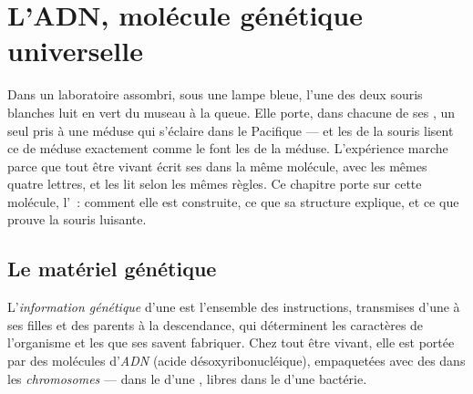\chapter{L'ADN, molécule génétique universelle}\label{ch:g10:universal-dna}

Dans un laboratoire assombri, sous une lampe bleue, l'une des deux
souris blanches luit en vert du museau à la queue. Elle porte, dans
chacune de ses , un seul  pris à une méduse qui s'éclaire
dans le Pacifique --- et les  de la souris lisent ce  de
méduse exactement comme le font les  de la méduse.
L'expérience marche parce que tout être vivant écrit ses  dans la
même molécule, avec les mêmes quatre lettres, et les lit selon les
mêmes règles. Ce chapitre porte sur cette molécule, l'~: comment
elle est construite, ce que sa structure explique, et ce que prouve la
souris luisante.

\section{Le matériel génétique}

\begin{definition}\label{def:g10:universal-dna:information}
L'\emph{information génétique} d'une
 est l'ensemble des instructions, transmises d'une  à ses
 filles et des parents à la descendance, qui déterminent les
caractères de l'organisme et les  que ses  savent
fabriquer. Chez tout être vivant, elle est portée par des molécules
d'\emph{ADN} (acide désoxyribonucléique), empaquetées avec
des  dans les \emph{chromosomes} --- dans le
 d'une , libres dans le  d'une
bactérie.
\end{definition}

